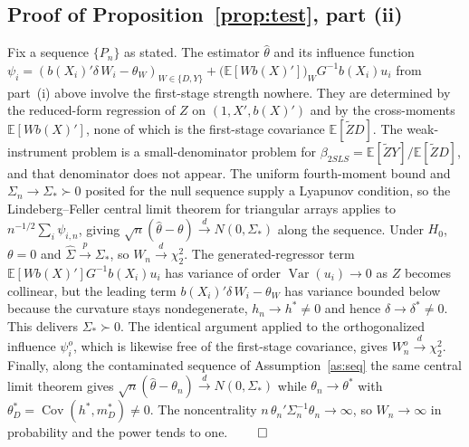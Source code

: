\documentclass[preprint,11pt,authoryear]{elsarticle}
\theoremstyle{definition}
\newcommand{\E}{\mathbb{E}}
\newcommand{\Cov}{\operatorname{Cov}}
\newcommand{\Var}{\operatorname{Var}}
\newcommand{\Ztil}{\tilde{Z}}
\newcommand{\convd}{\overset{d}{\longrightarrow}}
\newcommand{\convp}{\overset{p}{\longrightarrow}}
\begin{document}
\subsection*{Proof of Proposition~\ref{prop:test}, part (ii)}
Fix a sequence $\{P_n\}$ as stated. The estimator $\hat\theta$ and its influence
function
$\psi_{i}=(b(X_i)'\delta\,W_i-\theta_W)_{W\in\{D,Y\}}+\big(\E[Wb(X)']\big)_W G^{-1}b(X_i)u_i$
from part~(i) above involve the first-stage strength
nowhere. They are determined by the reduced-form regression of $Z$ on
$(1,X',b(X)')$ and by the cross-moments $\E[Wb(X)']$, none of which is the
first-stage covariance $\E[\Ztil D]$. The weak-instrument problem is a
small-denominator problem for $\beta_{2SLS}=\E[\Ztil Y]/\E[\Ztil D]$, and that
denominator does not appear. The uniform fourth-moment bound and
$\Sigma_n\to\Sigma_\ast\succ0$ posited for the null sequence supply a Lyapunov
condition, so the Lindeberg--Feller central limit theorem for triangular arrays
applies to $n^{-1/2}\sum_i\psi_{i,n}$, giving
$\sqrt n(\hat\theta-\theta)\convd N(0,\Sigma_\ast)$ along the sequence. Under $H_0$,
$\theta=0$ and $\hat\Sigma\convp\Sigma_\ast$, so $W_n\convd\chi^2_2$. The
generated-regressor term $\E[Wb(X)']G^{-1}b(X_i)u_i$ has variance of order
$\Var(u_i)\to0$ as $Z$ becomes collinear, but the leading term
$b(X_i)'\delta\,W_i-\theta_W$ has variance bounded below because the curvature stays
nondegenerate, $h_n\to h^\ast\neq0$ and hence $\delta\to\delta^\ast\neq0$. This
delivers $\Sigma_\ast\succ0$. The identical argument applied to the orthogonalized
influence $\psi^o_i$, which is likewise free of the first-stage covariance, gives
$W^o_n\convd\chi^2_2$. Finally, along the contaminated sequence of
Assumption~\ref{as:seq} the same central limit theorem gives
$\sqrt n(\hat\theta-\theta_n)\convd N(0,\Sigma_\ast)$ while $\theta_n\to\theta^\ast$
with $\theta_D^\ast=\Cov(h^\ast,m_D^\ast)\neq0$. The noncentrality
$n\,\theta_n'\Sigma_n^{-1}\theta_n\to\infty$, so $W_n\to\infty$ in probability and
the power tends to one. \hfill$\qed$
\end{document}
